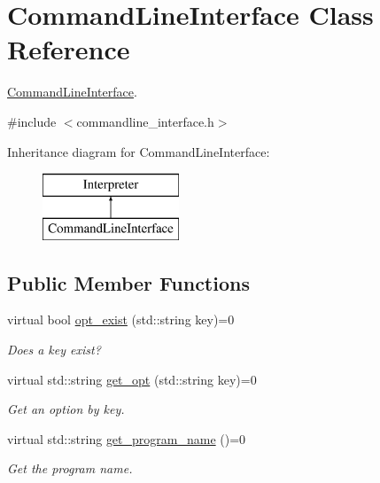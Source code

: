 \hypertarget{classCommandLineInterface}{\section{Command\-Line\-Interface Class Reference}
\label{classCommandLineInterface}
}


\hyperlink{classCommandLineInterface}{Command\-Line\-Interface}.  




{\ttfamily \#include $<$commandline\-\_\-interface.\-h$>$}

Inheritance diagram for Command\-Line\-Interface\-:\begin{figure}[H]
\begin{center}
\leavevmode
\includegraphics[height=2.000000cm]{classCommandLineInterface}
\end{center}
\end{figure}
\subsection*{Public Member Functions}
\begin{DoxyCompactItemize}
\item 
\hypertarget{classCommandLineInterface_a4ee445b7c34f27b7fc9d265d88e5d82a}{virtual bool \hyperlink{classCommandLineInterface_a4ee445b7c34f27b7fc9d265d88e5d82a}{opt\-\_\-exist} (std\-::string key)=0}\label{classCommandLineInterface_a4ee445b7c34f27b7fc9d265d88e5d82a}

\begin{DoxyCompactList}\small\item\em Does a key exist? \end{DoxyCompactList}\item 
\hypertarget{classCommandLineInterface_a12399397b591b0eb779caad05947f800}{virtual std\-::string \hyperlink{classCommandLineInterface_a12399397b591b0eb779caad05947f800}{get\-\_\-opt} (std\-::string key)=0}\label{classCommandLineInterface_a12399397b591b0eb779caad05947f800}

\begin{DoxyCompactList}\small\item\em Get an option by key. \end{DoxyCompactList}\item 
virtual std\-::string \hyperlink{classCommandLineInterface_a47bd2a11bc8d8f507a7f75dbef36a3c9}{get\-\_\-program\-\_\-name} ()=0
\begin{DoxyCompactList}\small\item\em Get the program name. \end{DoxyCompactList}\end{DoxyCompactItemize}


